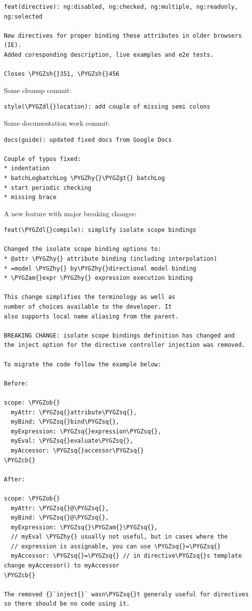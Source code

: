 \documentclass[letterpaper,10pt,english]{sphinxmanual}
\def\PYGZob{\char`\{}
\def\PYGZcb{\char`\}}
\def\PYGZam{\char`\&}
\def\PYGZgt{\char`\>}
\def\PYGZsh{\char`\#}
\def\PYGZdl{\char`\$}
\def\PYGZhy{\char`\-}
\def\PYGZsq{\char`\'}
\begin{document}
\begin{Verbatim}[commandchars=\\\{\}]
feat(directive): ng:disabled, ng:checked, ng:multiple, ng:readonly, ng:selected

New directives for proper binding these attributes in older browsers (IE).
Added coresponding description, live examples and e2e tests.

Closes \PYGZsh{}351, \PYGZsh{}456
\end{Verbatim}

Some cleanup commit:

\begin{Verbatim}[commandchars=\\\{\}]
style(\PYGZdl{}location): add couple of missing semi colons
\end{Verbatim}

Some documentation work commit:

\begin{Verbatim}[commandchars=\\\{\}]
docs(guide): updated fixed docs from Google Docs

Couple of typos fixed:
* indentation
* batchLogbatchLog \PYGZhy{}\PYGZgt{} batchLog
* start periodic checking
* missing brace
\end{Verbatim}

A new feature with major breaking changes:

\begin{Verbatim}[commandchars=\\\{\}]
feat(\PYGZdl{}compile): simplify isolate scope bindings

Changed the isolate scope binding options to:
* @attr \PYGZhy{} attribute binding (including interpolation)
* =model \PYGZhy{} by\PYGZhy{}directional model binding
* \PYGZam{}expr \PYGZhy{} expression execution binding

This change simplifies the terminology as well as
number of choices available to the developer. It
also supports local name aliasing from the parent.

BREAKING CHANGE: isolate scope bindings definition has changed and
the inject option for the directive controller injection was removed.

To migrate the code follow the example below:

Before:

scope: \PYGZob{}
  myAttr: \PYGZsq{}attribute\PYGZsq{},
  myBind: \PYGZsq{}bind\PYGZsq{},
  myExpression: \PYGZsq{}expression\PYGZsq{},
  myEval: \PYGZsq{}evaluate\PYGZsq{},
  myAccessor: \PYGZsq{}accessor\PYGZsq{}
\PYGZcb{}

After:

scope: \PYGZob{}
  myAttr: \PYGZsq{}@\PYGZsq{},
  myBind: \PYGZsq{}@\PYGZsq{},
  myExpression: \PYGZsq{}\PYGZam{}\PYGZsq{},
  // myEval \PYGZhy{} usually not useful, but in cases where the
  // expression is assignable, you can use \PYGZsq{}=\PYGZsq{}
  myAccessor: \PYGZsq{}=\PYGZsq{} // in directive\PYGZsq{}s template change myAccessor() to myAccessor
\PYGZcb{}

The removed {}`inject{}` wasn\PYGZsq{}t generaly useful for directives so there should be no code using it.
\end{Verbatim}
\end{document}
